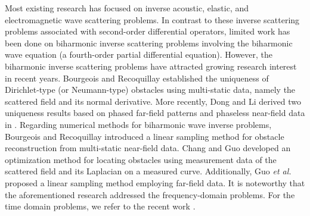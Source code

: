 \documentclass[10pt,a4paper]{article}
\numberwithin{equation}{section}
\begin{document}
Most existing research has focused on inverse acoustic, elastic, and electromagnetic wave scattering problems. In contrast to these inverse scattering problems associated with second-order differential operators, limited work has been done on biharmonic inverse scattering problems involving the biharmonic wave equation (a fourth-order partial differential equation). However, the biharmonic inverse scattering problems have attracted growing research interest in recent years. Bourgeois and Recoquillay \cite{bourgeois_linear_2020} established the uniqueness of Dirichlet-type (or Neumann-type) obstacles using multi-static data, namely the scattered field and its normal derivative. More recently, Dong and Li derived two uniqueness results based on phased far-field patterns and phaseless near-field data in \cite{dong_uniqueness_2024}. Regarding numerical methods for biharmonic wave inverse problems, Bourgeois and Recoquillay introduced a linear sampling method for obstacle reconstruction from multi-static near-field data. Chang and Guo \cite{chang_optimization_2023} developed an optimization method for locating obstacles using measurement data of the scattered field and its Laplacian on a measured curve. Additionally, Guo \emph{et al.} \cite{guo_direct_2025} proposed a linear sampling method employing far-field data. It is noteworthy that the aforementioned research addressed the frequency-domain problems. For the time domain problems, we refer to the recent work \cite{gao_inverse_2023}.
\end{document}
